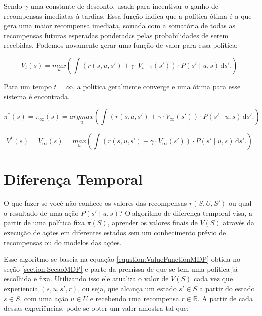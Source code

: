 Sendo $ \gamma $ uma constante de desconto, usada para incentivar o ganho de recompensas imediatas à tardias. Essa função indica que a política ótima é a que gera uma maior recompensa imediata, somada com a somatória de todas as recompensas futuras esperadas ponderadas pelas probabilidades de serem recebidas. Podemos novamente gerar uma função de valor para essa política:

\begin{equation}
    V_t \left( s \right) = \underset{u}{max} \left( \int \! \left( r \left( s, u, s' \right) + \gamma \cdot V_{t-1} \left( s' \right) \right) \cdot P \left( s' \mid u, s \right) \, \mathrm{d}s'. \right)
\end{equation}

Para um tempo $ t = \infty $, a política geralmente converge e uma ótima para esse sistema é encontrada.

\begin{equation}
    \pi^* \left( s \right) = \pi_\infty \left( s \right) = \underset{u}{argmax} \left( \int \! \left( r \left( s, u, s' \right) + \gamma \cdot V_\infty \left( s' \right) \right) \cdot P \left( s' \mid u, s \right) \, \mathrm{d}s'. \right)
\end{equation}

\begin{equation} \label{equation:ValueFunctionMDP}
    V^* \left( s \right) = V_\infty \left( s \right) = \underset{u}{max} \left( \int \! \left( r \left( s, u, s' \right) + \gamma \cdot V_\infty \left( s' \right) \right) \cdot P \left( s' \mid u, s \right) \, \mathrm{d}s'. \right)
\end{equation}


\section{Diferença Temporal}

O que fazer se você não conhece os valores das recompensas $ r \left( S, U, S' \right) $ ou qual o resultado de uma ação $ P \left( s' \mid u, s \right) $? O algoritmo de diferença temporal visa, a partir de uma política fixa $ \pi \left( S \right) $, aprender os valores finais de $ V \left( S \right) $ através da execução de ações em diferentes estados sem um conhecimento prévio de recompensas ou do modelos das ações.

Esse algoritmo se baseia na equação \ref{equation:ValueFunctionMDP} obtida no seção \ref{section:SecaoMDP} e parte da premissa de que se tem uma política já escolhida e fixa. Utilizando isso ele atualiza o valor de $ V \left( S \right) $ cada vez que experiencia $ \left( s, u, s', r \right) $, ou seja, que alcança um estado $ s' \in S $ a partir do estado $ s \in S $, com uma ação $ u \in U $ e recebendo uma recompensa $ r \in \mathbb{R} $. A partir de cada dessas experiências, pode-se obter um valor amostra tal que:

